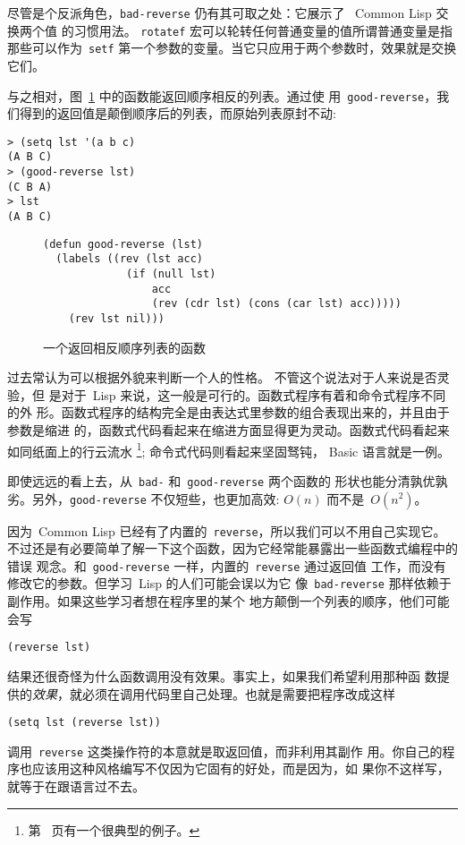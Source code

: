 尽管是个反派角色，\verb|bad-reverse| 仍有其可取之处：它展示了
~Common Lisp 交换两个值 的习惯用法。
\texttt{rotatef} 
宏可以轮转任何普通变量的值\pozhehao{}所谓普通变量是指那些可以作为~\texttt{setf} 
第一个参数的变量。当它只应用于两个参数时，效果就是交换它们。

与之相对，图~\ref{fig:good-reverse} 中的函数能返回顺序相反的列表。通过使
用~\texttt{good-reverse}，我们得到的返回值是颠倒顺序后的列表，而原始列表原封不动:
\begin{lstlisting}
> (setq lst '(a b c)
(A B C)
> (good-reverse lst)
(C B A)
> lst
(A B C)
\end{lstlisting}

\begin{figure}
\begin{lstlisting}
(defun good-reverse (lst)
  (labels ((rev (lst acc)
             (if (null lst)
                 acc
                 (rev (cdr lst) (cons (car lst) acc)))))
    (rev lst nil)))
\end{lstlisting}
\caption{\label{fig:good-reverse}一个返回相反顺序列表的函数}
\end{figure}

过去常认为可以根据外貌来判断一个人的性格。
不管这个说法对于人来说是否灵验，但
是对于~Lisp 来说，这一般是可行的。函数式程序有着和命令式程序不同的外
形。函数式程序的结构完全是由表达式里参数的组合表现出来的，并且由于参数是缩进
的，函数式代码看起来在缩进方面显得更为灵动。函数式代码看起来如同纸面上的行云流水
\footnote{第~\pageref{fig:fast_matching_operator} 页有一个很典型的例子。}; 命令式代码则看起来坚固驽钝，
Basic 语言就是一例。

即使远远的看上去，从~\texttt{bad-} 和~\texttt{good-reverse} 两个函数的
形状也能分清孰优孰劣。另外，\texttt{good-reverse} 不仅短些，也更加高效:
$O(n)$ 而不是~$O(n^2)$。

因为~Common Lisp 已经有了内置的~\texttt{reverse}，所以我们可以不用自己实现它。
不过还是有必要简单了解一下这个函数，因为它经常能暴露出一些函数式编程中的错误
观念。和~\texttt{good-reverse} 一样，内置的~\texttt{reverse} 通过返回值
工作，而没有修改它的参数。但学习~Lisp 的人们可能会误以为它
像~\texttt{bad-reverse} 那样依赖于副作用。如果这些学习者想在程序里的某个
地方颠倒一个列表的顺序，他们可能会写
\begin{lstlisting}
(reverse lst)
\end{lstlisting}
结果还很奇怪为什么函数调用没有效果。事实上，如果我们希望利用那种函
数提供的\emph{效果}，就必须在调用代码里自己处理。也就是需要把程序改成这样
\begin{lstlisting}
(setq lst (reverse lst))
\end{lstlisting}
调用~\texttt{reverse} 这类操作符的本意就是取返回值，而非利用其副作
用。你自己的程序也应该用这种风格编写\pozhehao{}不仅因为它固有的好处，而是因为，如
果你不这样写，就等于在跟语言过不去。

